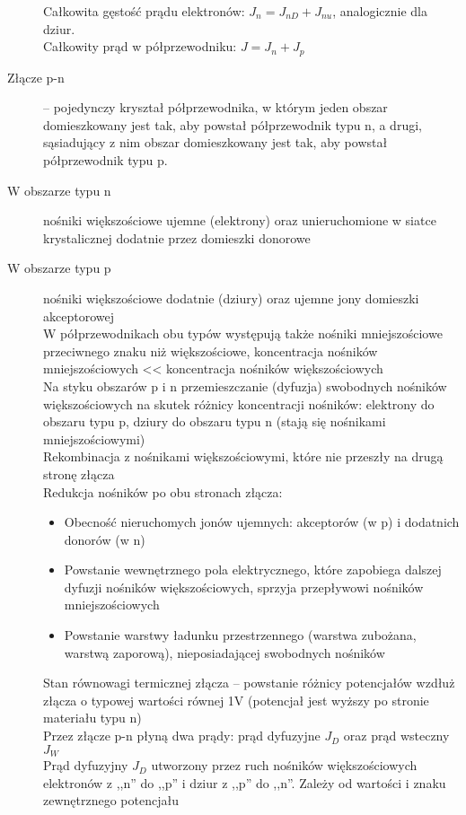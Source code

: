 \documentclass[a4paper,11pt]{article}
\begin{document}
\begin{description}
  Całkowita gęstość prądu elektronów: $J_n=J_{nD}+J_{nu}$, analogicznie dla dziur.\\
  Całkowity prąd w półprzewodniku: $J=J_n+J_p$
\item[Złącze p-n] -- pojedynczy kryształ półprzewodnika, w którym jeden obszar domieszkowany jest tak, aby powstał półprzewodnik typu n, a drugi, sąsiadujący z nim obszar domieszkowany jest tak, aby powstał półprzewodnik typu p.
\item[W obszarze typu n] nośniki większościowe ujemne (elektrony) oraz unieruchomione w siatce krystalicznej dodatnie przez domieszki donorowe
\item[W obszarze typu p] nośniki większościowe dodatnie (dziury) oraz ujemne jony domieszki akceptorowej\\
  W półprzewodnikach obu typów występują także nośniki mniejszościowe przeciwnego znaku niż większościowe, koncentracja nośników mniejszościowych << koncentracja nośników większościowych \\
  Na styku obszarów p i n przemieszczanie (dyfuzja) swobodnych nośników większościowych na skutek różnicy koncentracji nośników: elektrony do obszaru typu p, dziury do obszaru typu n (stają się nośnikami mniejszościowymi)\\
  Rekombinacja z nośnikami większościowymi, które nie przeszły na drugą stronę złącza\\
  Redukcja nośników po obu stronach złącza:
  \begin{itemize}
  \item Obecność nieruchomych jonów ujemnych: akceptorów (w p) i dodatnich donorów (w n)
  \item Powstanie wewnętrznego pola elektrycznego, które zapobiega dalszej dyfuzji nośników większościowych, sprzyja przepływowi nośników mniejszościowych
  \item Powstanie warstwy ładunku przestrzennego (warstwa zubożana, warstwą zaporową), nieposiadającej swobodnych nośników
  \end{itemize}
  Stan równowagi termicznej złącza -- powstanie różnicy potencjałów wzdłuż złącza o typowej wartości równej 1V (potencjał jest wyższy po stronie materiału typu n)\\
  Przez złącze p-n płyną dwa prądy: prąd dyfuzyjne $J_D$ oraz prąd wsteczny $J_W$\\
  Prąd dyfuzyjny $J_D$ utworzony przez ruch nośników większościowych elektronów z ,,n'' do ,,p'' i dziur z ,,p'' do ,,n''. Zależy od wartości i znaku zewnętrznego potencjału\\

\end{description}
\end{document}
